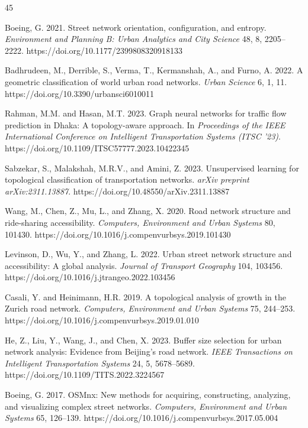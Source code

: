 \documentclass[sigconf, nonacm]{acmart}
\begin{document}

\begin{thebibliography}{45}


 Boeing, G. 2021. Street network orientation, configuration, and entropy. \textit{Environment and Planning B: Urban Analytics and City Science} 48, 8, 2205--2222. https://doi.org/10.1177/2399808320918133

 Badhrudeen, M., Derrible, S., Verma, T., Kermanshah, A., and Furno, A. 2022. A geometric classification of world urban road networks. \textit{Urban Science} 6, 1, 11. https://doi.org/10.3390/urbansci6010011

 Rahman, M.M. and Hasan, M.T. 2023. Graph neural networks for traffic flow prediction in Dhaka: A topology-aware approach. In \textit{Proceedings of the IEEE International Conference on Intelligent Transportation Systems (ITSC '23)}. https://doi.org/10.1109/ITSC57777.2023.10422345

 Sabzekar, S., Malakshah, M.R.V., and Amini, Z. 2023. Unsupervised learning for topological classification of transportation networks. \textit{arXiv preprint arXiv:2311.13887}. https://doi.org/10.48550/arXiv.2311.13887

 Wang, M., Chen, Z., Mu, L., and Zhang, X. 2020. Road network structure and ride-sharing accessibility. \textit{Computers, Environment and Urban Systems} 80, 101430. https://doi.org/10.1016/j.compenvurbsys.2019.101430

 Levinson, D., Wu, Y., and Zhang, L. 2022. Urban street network structure and accessibility: A global analysis. \textit{Journal of Transport Geography} 104, 103456. https://doi.org/10.1016/j.jtrangeo.2022.103456

 Casali, Y. and Heinimann, H.R. 2019. A topological analysis of growth in the Zurich road network. \textit{Computers, Environment and Urban Systems} 75, 244--253. https://doi.org/10.1016/j.compenvurbsys.2019.01.010

 He, Z., Liu, Y., Wang, J., and Chen, X. 2023. Buffer size selection for urban network analysis: Evidence from Beijing's road network. \textit{IEEE Transactions on Intelligent Transportation Systems} 24, 5, 5678--5689. https://doi.org/10.1109/TITS.2022.3224567

 Boeing, G. 2017. OSMnx: New methods for acquiring, constructing, analyzing, and visualizing complex street networks. \textit{Computers, Environment and Urban Systems} 65, 126--139. https://doi.org/10.1016/j.compenvurbsys.2017.05.004


\end{thebibliography}
\end{document}

